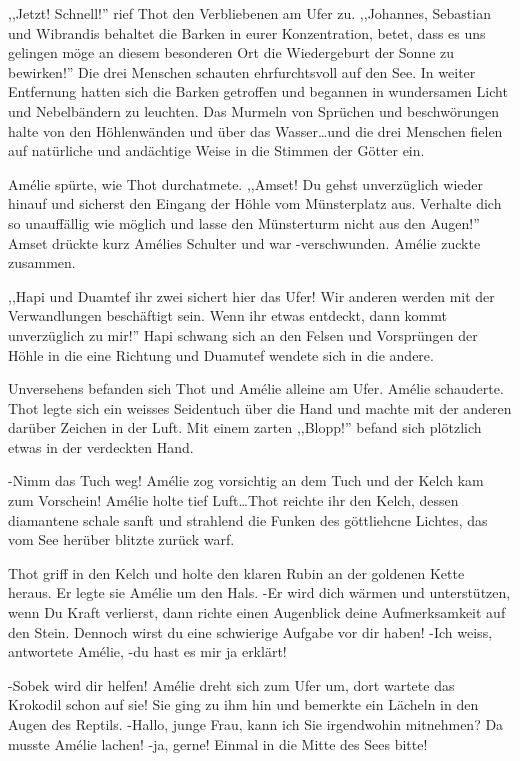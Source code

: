 ,,Jetzt! Schnell!'' rief Thot den Verbliebenen am Ufer zu. ,,Johannes, Sebastian und Wibrandis behaltet die Barken in eurer Konzentration, betet, dass es uns gelingen möge an diesem besonderen Ort die Wiedergeburt der Sonne zu bewirken!'' Die drei Menschen schauten ehrfurchtsvoll auf den See. In weiter Entfernung hatten sich die Barken getroffen und begannen in wundersamen Licht und Nebelbändern zu leuchten. Das Murmeln von Sprüchen und beschwörungen halte von den Höhlenwänden und über das Wasser\dots und die drei Menschen fielen auf natürliche und andächtige Weise in die Stimmen der Götter ein.

Amélie spürte, wie Thot durchatmete. ,,Amset! Du gehst unverzüglich wieder hinauf und sicherst den Eingang der Höhle vom Münsterplatz aus. Verhalte dich so unauffällig wie möglich und lasse den Münsterturm nicht aus den Augen!'' Amset drückte kurz Amélies Schulter und war -verschwunden. Amélie zuckte zusammen.

,,Hapi und Duamtef ihr zwei sichert hier das Ufer! Wir anderen werden mit der Verwandlungen beschäftigt sein. Wenn ihr etwas entdeckt, dann kommt unverzüglich zu mir!'' Hapi schwang sich an den Felsen und Vorsprüngen der Höhle in die eine Richtung und Duamutef wendete sich in die andere.

Unversehens befanden sich Thot und Amélie alleine am Ufer. Amélie schauderte. Thot legte sich ein weisses Seidentuch über die Hand und machte mit der anderen darüber Zeichen in der Luft. Mit einem zarten ,,Blopp!'' befand sich plötzlich etwas in der verdeckten Hand.

-Nimm das Tuch weg! Amélie zog vorsichtig an dem Tuch und der Kelch kam zum Vorschein! Amélie holte tief Luft\dots Thot reichte ihr den Kelch, dessen diamantene schale sanft und strahlend die Funken des göttliehcne Lichtes, das vom See herüber blitzte zurück warf.

Thot griff in den Kelch und holte den klaren Rubin an der goldenen Kette heraus. Er legte sie Amélie um den Hals. -Er wird dich wärmen und unterstützen, wenn Du Kraft verlierst, dann richte einen Augenblick deine Aufmerksamkeit auf den Stein. Dennoch wirst du eine schwierige Aufgabe vor dir haben! -Ich weiss, antwortete Amélie, -du hast es mir ja erklärt! 

-Sobek wird dir helfen! Amélie dreht sich zum Ufer um, dort wartete das Krokodil schon auf sie! Sie ging zu ihm hin und bemerkte ein Lächeln in den Augen des Reptils. -Hallo, junge Frau, kann ich Sie irgendwohin mitnehmen? Da musste Amélie lachen! -ja, gerne! Einmal in die Mitte des Sees bitte!

